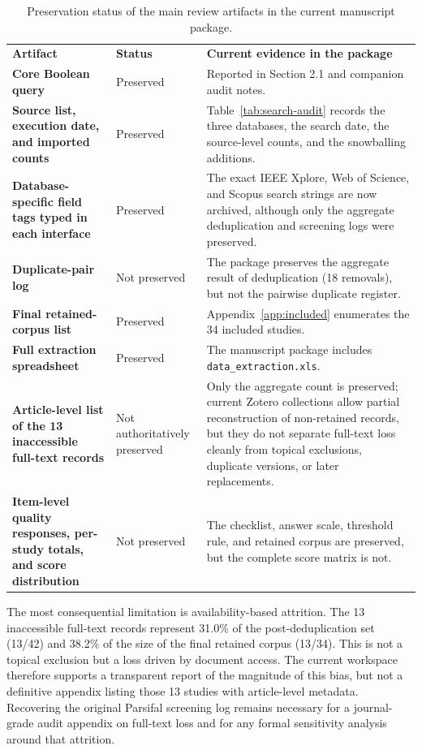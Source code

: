 \documentclass[preprint,12pt,number,longtitle]{elsarticle}
\begin{document}
\begin{table}[h]
\caption{Preservation status of the main review artifacts in the current manuscript package.}
\label{tab:audit-status}
\footnotesize
\setlength{\tabcolsep}{4pt}
\renewcommand{\arraystretch}{1.15}
\begin{tabularx}{\textwidth}{>{\raggedright\arraybackslash\bfseries}p{} >{\raggedright\arraybackslash}p{} >{\raggedright\arraybackslash}X}
\rowcolor{tablehead}
\textbf{Artifact} & \textbf{Status} & \textbf{Current evidence in the package} \\
Core Boolean query & Preserved & Reported in Section 2.1 and companion audit notes. \\
Source list, execution date, and imported counts & Preserved & Table~\ref{tab:search-audit} records the three databases, the search date, the source-level counts, and the snowballing additions. \\
Database-specific field tags typed in each interface & Preserved & The exact IEEE Xplore, Web of Science, and Scopus search strings are now archived, although only the aggregate deduplication and screening logs were preserved. \\
Duplicate-pair log & Not preserved & The package preserves the aggregate result of deduplication (18 removals), but not the pairwise duplicate register. \\
Final retained-corpus list & Preserved & Appendix~\ref{app:included} enumerates the 34 included studies. \\
Full extraction spreadsheet & Preserved & The manuscript package includes \texttt{data\_extraction.xls}. \\
Article-level list of the 13 inaccessible full-text records & Not authoritatively preserved & Only the aggregate count is preserved; current Zotero collections allow partial reconstruction of non-retained records, but they do not separate full-text loss cleanly from topical exclusions, duplicate versions, or later replacements. \\
Item-level quality responses, per-study totals, and score distribution & Not preserved & The checklist, answer scale, threshold rule, and retained corpus are preserved, but the complete score matrix is not. \\
\end{tabularx}
\end{table}

The most consequential limitation is availability-based attrition. The 13 inaccessible full-text records represent 31.0\% of the post-deduplication set (13/42) and 38.2\% of the size of the final retained corpus (13/34). This is not a topical exclusion but a loss driven by document access. The current workspace therefore supports a transparent report of the magnitude of this bias, but not a definitive appendix listing those 13 studies with article-level metadata. Recovering the original Parsifal screening log remains necessary for a journal-grade audit appendix on full-text loss and for any formal sensitivity analysis around that attrition.
\end{document}

